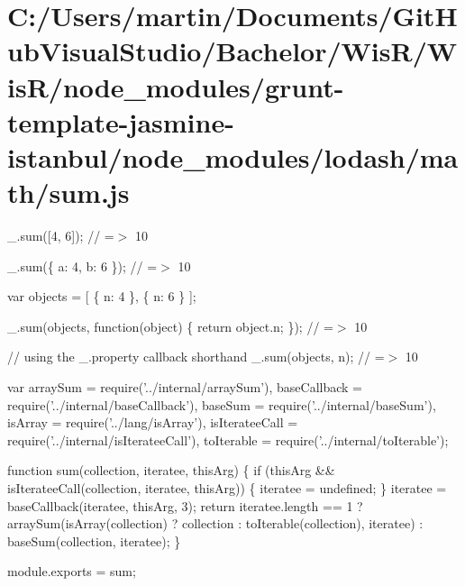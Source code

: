 \hypertarget{_c_1_2_users_2martin_2_documents_2_git_hub_visual_studio_2_bachelor_2_wis_r_2_wis_r_2node_module99a0b6c9c6af1395ddf70e42e7e6c872}{}\section{C\+:/\+Users/martin/\+Documents/\+Git\+Hub\+Visual\+Studio/\+Bachelor/\+Wis\+R/\+Wis\+R/node\+\_\+modules/grunt-\/template-\/jasmine-\/istanbul/node\+\_\+modules/lodash/math/sum.\+js}
\+\_\+.\+sum(\mbox{[}4, 6\mbox{]}); // =$>$ 10

\+\_\+.\+sum(\{ \textquotesingle{}a\textquotesingle{}\+: 4, \textquotesingle{}b\textquotesingle{}\+: 6 \}); // =$>$ 10

var objects = \mbox{[} \{ \textquotesingle{}n\textquotesingle{}\+: 4 \}, \{ \textquotesingle{}n\textquotesingle{}\+: 6 \} \mbox{]};

\+\_\+.\+sum(objects, function(object) \{ return object.\+n; \}); // =$>$ 10

// using the {\ttfamily \+\_\+.\+property} callback shorthand \+\_\+.\+sum(objects, \textquotesingle{}n\textquotesingle{}); // =$>$ 10


\begin{DoxyCodeInclude}
var arraySum = require(\textcolor{stringliteral}{'../internal/arraySum'}),
    baseCallback = require(\textcolor{stringliteral}{'../internal/baseCallback'}),
    baseSum = require(\textcolor{stringliteral}{'../internal/baseSum'}),
    isArray = require(\textcolor{stringliteral}{'../lang/isArray'}),
    isIterateeCall = require(\textcolor{stringliteral}{'../internal/isIterateeCall'}),
    toIterable = require(\textcolor{stringliteral}{'../internal/toIterable'});

\textcolor{keyword}{function} sum(collection, iteratee, thisArg) \{
  \textcolor{keywordflow}{if} (thisArg && isIterateeCall(collection, iteratee, thisArg)) \{
    iteratee = undefined;
  \}
  iteratee = baseCallback(iteratee, thisArg, 3);
  \textcolor{keywordflow}{return} iteratee.length == 1
    ? arraySum(isArray(collection) ? collection : toIterable(collection), iteratee)
    : baseSum(collection, iteratee);
\}

module.exports = sum;
\end{DoxyCodeInclude}
 